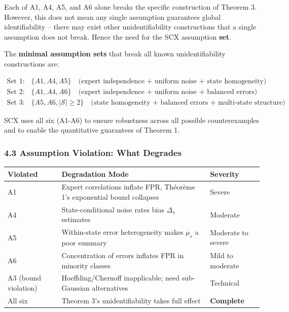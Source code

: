 \documentclass[
  12pt,
]{ctexart}
\begin{document}
Each of A1, A4, A5, and A6 alone breaks the specific construction of
Theorem 3. However, this does not mean any single assumption guarantees
global identifiability -- there may exist other unidentifiability
constructions that a single assumption does not break. Hence the need
for the SCX assumption \textbf{set}.

The \textbf{minimal assumption sets} that break all known
unidentifiability constructions are:

\[\begin{aligned}
\text{Set 1: } & \{A1, A4, A5\} \quad \text{(expert independence + uniform noise + state homogeneity)} \\
\text{Set 2: } & \{A1, A4, A6\} \quad \text{(expert independence + uniform noise + balanced errors)} \\
\text{Set 3: } & \{A5, A6, |\mathcal{S}| \geq 2\} \quad \text{(state homogeneity + balanced errors + multi-state structure)}
\end{aligned}\]

SCX uses all six (A1-A6) to ensure robustness across all possible
counterexamples and to enable the quantitative guarantees of Theorem 1.

\subsubsection{4.3 Assumption Violation: What
Degrades}\label{assumption-violation-what-degrades}

\begin{longtable}[]{@{}
  >{\raggedright\arraybackslash}p{}
  >{\raggedright\arraybackslash}p{}
  >{\raggedright\arraybackslash}p{}@{}}
\toprule\noalign{}
\begin{minipage}[b]{\linewidth}\raggedright
Violated
\end{minipage} & \begin{minipage}[b]{\linewidth}\raggedright
Degradation Mode
\end{minipage} & \begin{minipage}[b]{\linewidth}\raggedright
Severity
\end{minipage} \\
\midrule\noalign{}
\endhead
\bottomrule\noalign{}
\endlastfoot
A1 & Expert correlations inflate FPR, Théorème 1's exponential bound
collapses & Severe \\
A4 & State-conditional noise rates bias \(\Delta_s\) estimates &
Moderate \\
A5 & Within-state error heterogeneity makes \(\mu_s\) a poor summary &
Moderate to severe \\
A6 & Concentration of errors inflates FPR in minority classes & Mild to
moderate \\
A3 (bound violation) & Hoeffding/Chernoff inapplicable; need
sub-Gaussian alternatives & Technical \\
All six & Theorem 3's unidentifiability takes full effect &
\textbf{Complete} \\
\end{longtable}
\end{document}
